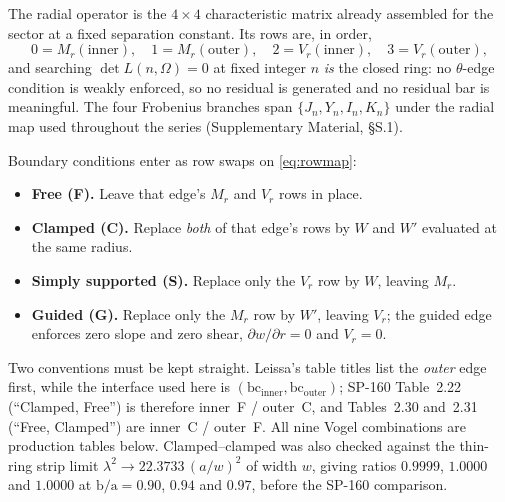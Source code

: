 \documentclass[11pt]{article}
\newcommand{\lamsq}{\lambda^{2}}
\newcommand{\ba}{\mbox{b/a}}
\begin{document}
The radial operator is the $4\times4$ characteristic matrix already assembled
for the sector at a fixed separation constant. Its rows are, in order,
\begin{equation}
0=M_r(\text{inner}),\quad 1=M_r(\text{outer}),\quad
2=V_r(\text{inner}),\quad 3=V_r(\text{outer}),
\label{eq:rowmap}
\end{equation}
and searching $\det L(n,\Omega)=0$ at fixed integer $n$ \emph{is} the closed
ring: no $\theta$-edge condition is weakly enforced, so no residual is
generated and no residual bar is meaningful. The four Frobenius branches span
$\{J_n,Y_n,I_n,K_n\}$ under the radial map used throughout the series
(Supplementary Material, \S{}S.1).

Boundary conditions enter as row swaps on \eqref{eq:rowmap}:
\begin{itemize}\itemsep2pt
\item \textbf{Free (F).} Leave that edge's $M_r$ and $V_r$ rows in place.
\item \textbf{Clamped (C).} Replace \emph{both} of that edge's rows by $W$ and
      $W'$ evaluated at the same radius.
\item \textbf{Simply supported (S).} Replace only the $V_r$ row by $W$, leaving
      $M_r$.
\item \textbf{Guided (G).} Replace only the $M_r$ row by $W'$, leaving $V_r$;
      the guided edge enforces zero slope and zero shear,
      $\partial w/\partial r=0$ and $V_r=0$.
\end{itemize}
Two conventions must be kept straight. Leissa's table titles list the
\emph{outer} edge first, while the interface used here is
$(\mathrm{bc}_{\text{inner}},\mathrm{bc}_{\text{outer}})$; SP-160
Table~2.22 (``Clamped, Free'') is therefore inner~F / outer~C, and
Tables~2.30 and~2.31 (``Free, Clamped'') are inner~C / outer~F. All nine
Vogel combinations are production tables below. Clamped--clamped was also
checked against the thin-ring strip limit
$\lamsq\to22.3733\,(a/w)^2$ of width $w$, giving ratios $0.9999$, $1.0000$
and $1.0000$ at $\ba=0.90$, $0.94$ and $0.97$, before the SP-160 comparison.
\end{document}

